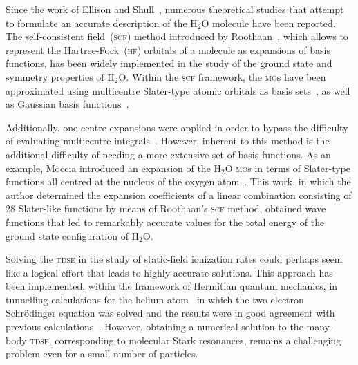 

Since the work of Ellison and Shull~\cite{EllisonShullh2o_1955},
numerous theoretical studies that attempt to formulate an accurate
description of the H$_{2}$O molecule have been reported. The
self-consistent field~(\textsc{scf}) method introduced by
Roothaan~\cite{Roothaan_HF}, which allows to represent the
Hartree-Fock~(\textsc{hf}) orbitals of a molecule as expansions of
basis functions, has been widely implemented in the study of the
ground state and symmetry properties of H$_{2}$O. Within the
\textsc{scf} framework, the \textsc{mo}s have been approximated using
multicentre Slater-type atomic orbitals as basis
sets~\cite{Reeves_nature_1956,natureH2O_1960,Pitzer_1968,Pitzer_1970},
as well as Gaussian basis
functions~\cite{gaussianH2O_1965,Neumann_gaussian_1968}.

Additionally, one-centre expansions were applied in order to bypass
the difficulty of evaluating multicentre
integrals~\cite{Moccia_1964,oneCentre_1961,Parr_JCP_1960}. However,
inherent to this method is the additional difficulty of needing a more
extensive set of basis functions. As an example, Moccia introduced an
expansion of the H$_{2}$O \textsc{mo}s in terms of Slater-type
functions all centred at the nucleus of the oxygen
atom~\cite{Moccia_1964}. This work, in which the author determined the
expansion coefficients of a linear combination consisting of $28$
Slater-like functions by means of Roothaan's \textsc{scf} method,
obtained wave functions that led to remarkably accurate values for the
total energy of the ground state configuration of H$_{2}$O.


Solving the \textsc{tdse} in the study of static-field ionization
rates could perhaps seem like a logical effort that leads to highly
accurate solutions. This approach has been implemented, within the
framework of Hermitian quantum mechanics, in tunnelling calculations
for the helium atom~\cite{static_tdse_He,static_tdse_He_method} in
which the two-electron Schr\"{o}dinger equation was solved and the
results were in good agreement with previous
calculations~\cite{static_He_scrinzi}. However, obtaining a numerical
solution to the many-body \textsc{tdse}, corresponding to molecular
Stark resonances, remains a challenging problem even for a small
number of particles.

